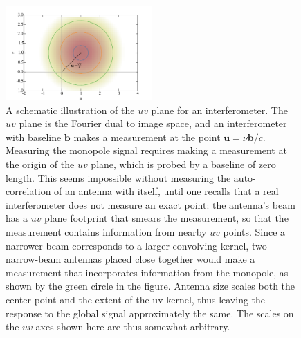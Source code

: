 \documentclass[twocolumn,apj,numberedappendix]{emulateapj}
\def\b{\mathbf{b}}
\newcommand{\acl}[1]{}
\begin{document}
\begin{figure}[h]
	\centering
	\includegraphics[width=0.50\textwidth] {figures/uv_cartoon.pdf}
	\caption{A schematic illustration of the $uv$ plane for an interferometer. The $uv$ plane is the Fourier dual to image space, and an interferometer with baseline $\b$ makes a measurement at the point $\mathbf{u} = \nu\b / c$. Measuring the monopole signal requires making a measurement at the origin of the $uv$ plane, which is probed by a baseline of zero length. This seems impossible without measuring the auto-correlation of an antenna with itself, until one recalls that a real interferometer does not measure an exact point: the antenna's beam has a $uv$ plane footprint that smears the measurement, so that the measurement contains information from nearby $uv$ points. Since a narrower beam corresponds to a larger convolving kernel, two narrow-beam antennas placed close together would make a measurement that incorporates information from the monopole, as shown by the green circle in the figure. Antenna size scales both the center point and the extent of the uv kernel, thus leaving the response to the global signal approximately the same. The scales on the $uv$ axes shown here are thus somewhat arbitrary. \acl{Added last two sentences}}
	\label{fig:uv_cartoon}
\end{figure}
\end{document}
